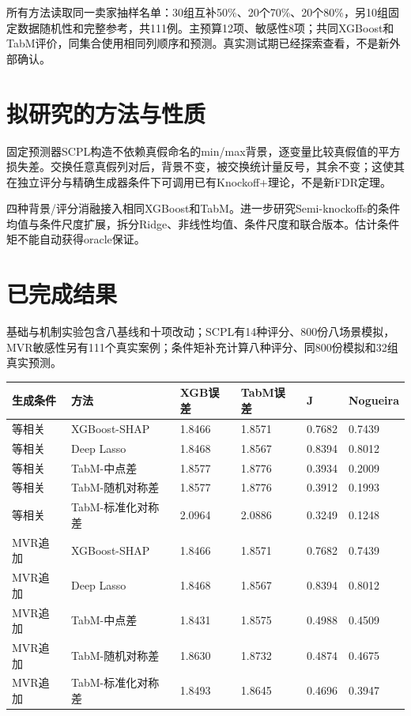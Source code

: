 \documentclass[UTF8,11pt,a4paper]{ctexart}
\begin{document}
所有方法读取同一卖家抽样名单：30组互补50\%、20个70\%、20个80\%，另10组固定数据随机性和完整参考，共111例。主预算12项、敏感性8项；共同XGBoost和TabM评价，同集合使用相同列顺序和预测。真实测试期已经探索查看，不是新外部确认。

\section{拟研究的方法与性质}

固定预测器SCPL构造不依赖真假命名的min/max背景，逐变量比较真假值的平方损失差。交换任意真假列对后，背景不变，被交换统计量反号，其余不变；这使其在独立评分与精确生成器条件下可调用已有Knockoff+理论，不是新FDR定理。

四种背景/评分消融接入相同XGBoost和TabM。进一步研究Semi-knockoffs的条件均值与条件尺度扩展，拆分Ridge、非线性均值、条件尺度和联合版本。估计条件矩不能自动获得oracle保证。

\section{已完成结果}

基础与机制实验包含八基线和十项改动；SCPL有14种评分、800份八场景模拟，MVR敏感性另有111个真实案例；条件矩补充计算八种评分、同800份模拟和32组真实预测。

{\def\LTcaptype{none} %
{
\footnotesize
\begin{longtable}[]{@{}llllll@{}}
\toprule\noalign{}
生成条件 & 方法 & XGB误差 & TabM误差 & J & Nogueira \\
\midrule\noalign{}
\endhead
\bottomrule\noalign{}
\endlastfoot
等相关 & XGBoost-SHAP & 1.8466 & 1.8571 & 0.7682 & 0.7439 \\
等相关 & Deep Lasso & 1.8468 & 1.8567 & 0.8394 & 0.8012 \\
等相关 & TabM-中点差 & 1.8577 & 1.8776 & 0.3934 & 0.2009 \\
等相关 & TabM-随机对称差 & 1.8577 & 1.8776 & 0.3912 & 0.1993 \\
等相关 & TabM-标准化对称差 & 2.0964 & 2.0886 & 0.3249 & 0.1248 \\
MVR追加 & XGBoost-SHAP & 1.8466 & 1.8571 & 0.7682 & 0.7439 \\
MVR追加 & Deep Lasso & 1.8468 & 1.8567 & 0.8394 & 0.8012 \\
MVR追加 & TabM-中点差 & 1.8431 & 1.8575 & 0.4988 & 0.4509 \\
MVR追加 & TabM-随机对称差 & 1.8630 & 1.8732 & 0.4874 & 0.4675 \\
MVR追加 & TabM-标准化对称差 & 1.8493 & 1.8645 & 0.4696 & 0.3947 \\
\end{longtable}
}
}
\end{document}
